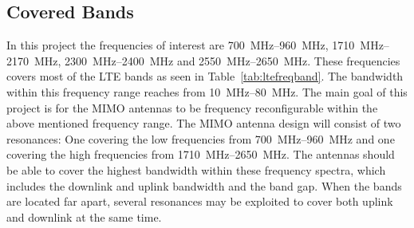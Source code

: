 \subsection{Covered Bands}
In this project the frequencies of interest are \SIrange{700}{960}{MHz}, \SIrange{1710}{2170}{MHz}, \SIrange{2300}{2400}{MHz} and \SIrange{2550}{2650}{MHz}. These frequencies covers most of the LTE bands as seen in Table~\ref{tab:ltefreqband}. The bandwidth within this frequency range reaches from \SIrange{10}{80}{MHz}. The main goal of this project is for the MIMO antennas to be frequency reconfigurable within the above mentioned frequency range. The MIMO antenna design will consist of two resonances: One covering the low frequencies from \SIrange{700}{960}{MHz} and one covering the high frequencies from \SIrange{1710}{2650}{MHz}. The antennas should be able to cover the highest bandwidth within these frequency spectra, which includes the downlink and uplink bandwidth and the band gap. When the bands are located far apart, several resonances may be exploited to cover both uplink and downlink at the same time.

